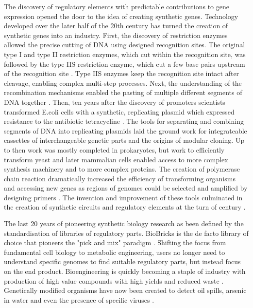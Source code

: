 \documentclass[../main.tex]{subfiles}
\begin{document}
The discovery of regulatory elements with predictable contributions to gene expression opened the door to the idea of creating synthetic genes.
Technology developed over the later half of the 20th century has turned the creation of synthetic genes into an industry.
First, the discovery of restriction enzymes allowed the precise cutting of DNA using designed recognition sites. 
The original type I and type II restriction enzymes, which cut within the recognition site, \parencite{Arber2003,Meselson1968,Smith1970,Kelly1970} was followed by the type IIS restriction enzyme, which cut a few base pairs upstream of the recognition site \parencite{Pingoud2014}. 
Type IIS enzymes keep the recognition site intact after cleavage, enabling complex multi-step processes.
Next, the understanding of the recombination mechanisms enabled the pasting of multiple different segments of DNA together \parencite{Jackson1972,Cohen1973}. 
Then, ten years after the discovery of promoters scientists transformed E.coli cells with a synthetic, replicating plasmid which expressed resistance to the antibiotic tetracycline \parencite{Cohen1973}. 
The tools for separating and combining segments of DNA into replicating plasmids laid the ground work for integrateable cassettes of interchangeable genetic parts and the origins of modular cloning.
Up to then work was mostly completed in prokaryotes, but work to efficiently transform yeast \parencite{Beggs1978} and later mammalian cells \parencite{Capecchi1989} enabled access to more complex synthesis machinery and to more complex proteins. 
The creation of polymerase chain reaction dramatically increased the efficiency of transforming organisms and accessing new genes as regions of genomes could be selected and amplified by designing primers \parencite{Saiki1988}. 
The invention and improvement of these tools culminated in the creation of synthetic circuits and regulatory elements at the turn of century \parencite{Elowitz2000,Gardner2000}.

The last 20 years of pioneering synthetic biology research as been defined by the standardisation of libraries of regulatory parts. 
BioBricks is the de facto library of choice that pioneers the "pick and mix" paradigm \parencite{Knight2003}.
Shifting the focus from fundamental cell biology to metabolic engineering, users no longer need to understand specific genomes to find suitable regulatory parts, but instead focus on the end product. 
Bioengineering is quickly becoming a staple of industry with production of high value compounds with high yields and reduced waste \parencite{Krivoruchko2015}.
Genetically modified organisms have now been created to detect oil spills, arsenic in water and even the presence of specific viruses \parencite{Wan2019,Willardson1998,Tancharoen2019}.
\end{document}
